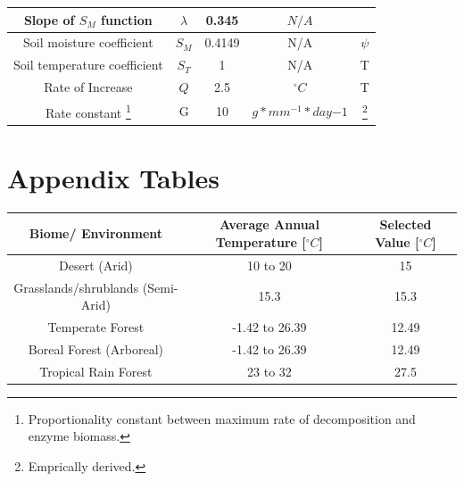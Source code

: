 \documentclass[12pt]{article}
\begin{document}
\begin{savenotes}
\begin{table}[ht]
\begin{center}
\begin{tabular}{|c c c c c|}
				Slope of $S_M$ function & $\lambda$ & 0.345 & $N/A$ &\cite{Moorhead1991}\\ %
				\hline
				Soil moisture coefficient & $S_M$ & 0.4149 & N/A &\cite{Moorhead1991} $\psi$\\ %
				\hline
				Soil temperature coefficient & $S_T$ & 1 & N/A &\cite{Moorhead1991} T\\
				\hline
				Rate of Increase & $Q$ & 2.5 & $^{\circ}C$ &\cite{Moorhead1991} T\\
				\hline
				Rate constant \footnote{Proportionality constant between maximum rate of decomposition and enzyme biomass.} & G & 10 & $g*mm^{-1}*day{-1}$ &\cite{Lustenhouwer2020}\footnote{Emprically derived.}\\  %
				\hline
			\end{tabular}
		\vspace*{-3ex}
		\label{table3}
		\end{center}
	\end{table}
\end{savenotes}


\section{Appendix Tables}

\begin{table}[H]
	\begin{center}
		\begin{tabular}{|c c c|} 
			\hline
			Biome/ Environment & Average Annual Temperature [$^{\circ}C$] & Selected Value [$^{\circ}C$]\\ [0.5ex] 
			\hline\hline
			Desert (Arid) & 10 to 20 \cite{Davey2007} & 15 \\ 
			\hline
			Grasslands/shrublands (Semi-Arid) & 15.3 \cite{Pelaez1994} & 15.3 \\
			\hline
			Temperate Forest & -1.42 to 26.39 \cite{Zaz2019} & 12.49 \\
			\hline
			Boreal Forest (Arboreal)& -1.42 to 26.39 \cite{Zaz2019} & 12.49 \\
			\hline
			Tropical Rain Forest & 23 to 32 \cite{Paton2019} &27.5 \\
			\hline
		\end{tabular}
	\vspace*{-3ex}
	\label{table6}
	\end{center}
\end{table}
\end{document}
